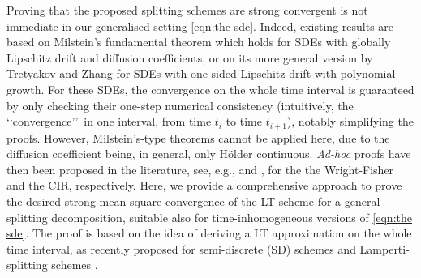 \documentclass[a4paper,12pt]{article}
\numberwithin{equation}{section}
\theoremstyle{plain}
\theoremstyle{definition}
\begin{document}
Proving that the proposed splitting schemes are strong convergent is not immediate in our generalised setting \eqref{eqn:the sde}. Indeed, existing results are based on 
Milstein's fundamental theorem \cite{milstein_numerical_1995} 
which holds for SDEs with globally Lipschitz drift and diffusion coefficients, or on its more general version by Tretyakov and Zhang \cite{tretyakov_fundamental_2013}  for SDEs with one-sided Lipschitz drift with polynomial growth. For these SDEs, the convergence on the whole time interval is guaranteed by only checking their one-step numerical consistency (intuitively, the \lq\lq convergence\rq\rq\ in one interval, from time $t_i$ to time $t_{i+1}$), notably simplifying the proofs. However, Milstein's-type theorems cannot be applied here, due to the diffusion coefficient being, in general, only H\"older continuous. \textit{Ad-hoc} proofs have then been proposed in the literature, see, e.g., \cite{chen_strong_2023} and \cite{kelly_adaptive_2023}, for the the Wright-Fisher and the CIR, respectively. Here, we provide a comprehensive approach to prove the desired strong mean-square convergence of the LT scheme for a general splitting decomposition, suitable also for time-inhomogeneous versions of \eqref{eqn:the sde}. The proof is based on the idea of deriving a LT approximation on the whole time interval, as recently proposed for semi-discrete (SD) schemes \cite{stamatiou_numerical_2016,stamatiou_boundary_2018} and Lamperti-splitting schemes \cite{ulander_boundary-preserving_2024}. 
\end{document}
